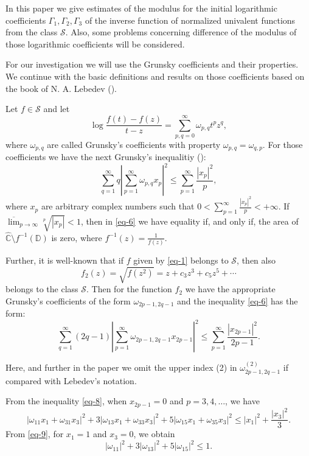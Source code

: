 \documentclass{amsart}
\newcommand{\D}{{\mathbb D}}
\def\be{\begin{equation}}
\def\ee{\end{equation}}
\begin{document}
\medskip

In this paper we give estimates of the modulus for the initial logarithmic coefficients $\Gamma_{1},\Gamma_{2},\Gamma_{3}$ of the inverse function of normalized univalent  functions from the class $ \mathcal{S}$. Also, some problems concerning difference of the modulus of those  logarithmic coefficients  will be considered.

\medskip

For our investigation we  will use the Grunsky coefficients and their properties. We continue with the basic definitions and results  on those coefficients based on the book of N. A. Lebedev (\cite{Lebedev}).

\medskip

Let $f \in \mathcal{S}$ and let
\[
\log\frac{f(t)-f(z)}{t-z}=\sum_{p,q=0}^{\infty}\omega_{p,q}t^{p}z^{q},
\]
where $\omega_{p,q}$ are called Grunsky's coefficients with property $\omega_{p,q}=\omega_{q,p}$.
For those coefficients we have the next Grunsky's inequalitiy (\cite{duren,Lebedev}):
\be\label{eq-6}
\sum_{q=1}^{\infty}q \left|\sum_{p=1}^{\infty}\omega_{p,q}x_{p}\right|^{2}\leq \sum_{p=1}^{\infty}\frac{|x_{p}|^{2}}{p},
\ee
where $x_{p}$ are arbitrary complex numbers such that $0< \sum_{p=1}^{\infty}\frac{|x_{p}|^{2}}{p}< +\infty$. If $\overline{\lim}_{p\to\infty} \sqrt[p]{|x_p|}<1$, then in \eqref{eq-6} we have equality if, and only if, the area of $\widehat{\mathbb{C}} \setminus f^{-1}(\D)$ is zero, where $f^{-1}(z)= \frac{1}{f(z)}$.

\medskip

Further, it is well-known that if $f$ given by \eqref{eq-1}
belongs to $\mathcal{S}$, then also
\[
f_{2}(z)=\sqrt{f(z^{2})}=z +c_{3}z^3+c_{5}z^{5}+\cdots
\]
belongs to the class $\mathcal{S}$. Then for the function $f_{2}$ we have the appropriate Grunsky's
coefficients of the form $\omega_{2p-1,2q-1}$ and the inequality \eqref{eq-6} has the form:
\be\label{eq-8}
\sum_{q=1}^{\infty}(2q-1) \left|\sum_{p=1}^{\infty}\omega_{2p-1,2q-1}x_{2p-1}\right|^{2}\leq \sum_{p=1}^{\infty}\frac{|x_{2p-1}|^{2}}{2p-1}.
\ee

\medskip

Here, and further in the paper we omit the upper index (2) in  $\omega_{2p-1,2q-1}^{(2)}$ if compared with Lebedev's notation.

\medskip

From the inequality \eqref{eq-8}, when $x_{2p-1}=0$ and $p=3,4,\ldots$, we have
\begin{equation}\label{eq-9}
|\omega_{11} x_1 +\omega_{31} x_3 |^2 +3|\omega_{13} x_1 +\omega_{33} x_3 |^2 + 5|\omega_{15} x_1 +\omega_{35} x_3 |^2 \le |x_1|^2+\frac{|x_3|^2}{3}.
\end{equation}
 From \eqref{eq-9}, for $x_1=1$ and $x_3=0$, we obtain
\[
  |\omega_{11}|^2 + 3 |\omega_{13}|^2 + 5|\omega_{15}|^2 \leq1.
\]
\end{document}

